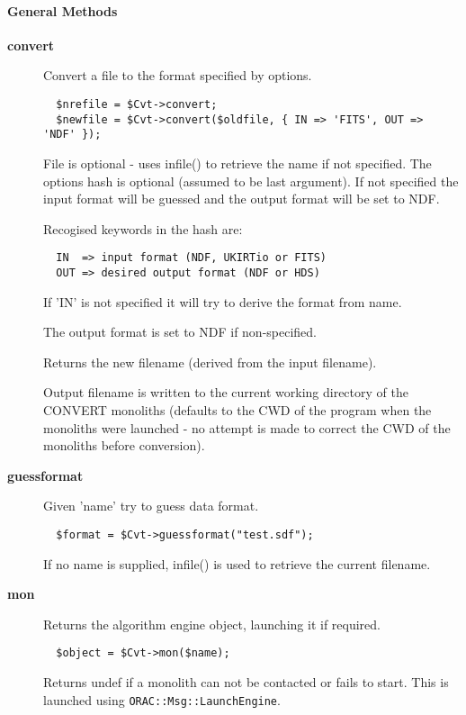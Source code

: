 \paragraph*{General Methods\label{ORAC::Convert_General_Methods}}\begin{description}
\item[\textbf{convert}] \mbox{}

Convert a file to the format specified by options.

\begin{verbatim}
  $nrefile = $Cvt->convert;
  $newfile = $Cvt->convert($oldfile, { IN => 'FITS', OUT => 'NDF' });
\end{verbatim}


File is optional - uses infile() to retrieve the name if not specified.
The options hash is optional (assumed to be last argument). If not
specified the input format will be guessed and the output format
will be set to NDF.



Recogised keywords in the hash are:

\begin{verbatim}
  IN  => input format (NDF, UKIRTio or FITS)
  OUT => desired output format (NDF or HDS)
\end{verbatim}


If 'IN' is not specified it will try to derive the format from
name.



The output format is set to NDF if non-specified.



Returns the new filename (derived from the input filename).



Output filename is written to the current working directory of the
CONVERT monoliths (defaults to the CWD of the program when the
monoliths were launched - no attempt is made to correct the
CWD of the monoliths before conversion).

\item[\textbf{guessformat}] \mbox{}

Given 'name' try to guess data format.

\begin{verbatim}
  $format = $Cvt->guessformat("test.sdf");
\end{verbatim}


If no name is supplied, infile() is used to retrieve the current
filename.

\item[\textbf{mon}] \mbox{}

Returns the algorithm engine object, launching it if required.

\begin{verbatim}
  $object = $Cvt->mon($name);
\end{verbatim}


Returns undef if a monolith can not be contacted or fails to start.
This is launched using \texttt{ORAC::Msg::LaunchEngine}.

\end{description}
